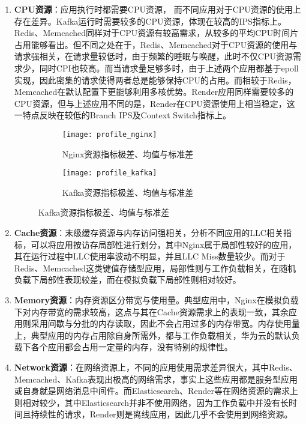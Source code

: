 \begin{enumerate}

    \item \textbf{CPU资源}：应用执行时都需要CPU资源， 而不同应用对于CPU资源的使用上存在差异。Kafka运行时需要较多的CPU资源，体现在较高的IPS指标上。Redis、Memcached同样对于CPU资源有较高需求，从较多的平均CPU时间片占用能够看出。但不同之处在于，Redis、Memcached对于CPU资源的使用与请求强相关，在请求量较低时，由于频繁的睡眠与唤醒，此时不仅CPU资源需求少，同时CPI也较高。而当请求量足够多时，由于上述两个应用都基于epoll实现，因此密集的请求使得两者总是能够保持CPU的占用。而相较于Redis，Memcached在默认配置下更能够利用多核优势。Render应用同样需要较多的CPU资源，但与上述应用不同的是，Render在CPU资源使用上相当稳定，这一特点反映在较低的Branch IPS及Context Switch指标上。

\begin{figure}[H]
    \centering
    \begin{subfigure}[b]{0.9\textwidth}
      \texttt{[image: profile\_nginx]}
      \caption{Nginx资源指标极差、均值与标准差}
      \label{fig:profile_nginx}
    \end{subfigure}
    \begin{subfigure}[b]{0.9\textwidth}
        \texttt{[image: profile\_kafka]}
        \caption{Kafka资源指标极差、均值与标准差}
        \label{fig:profile_kafka}
    \end{subfigure}
\label{fig:resource_affinity_1}
\end{figure}

    \item \textbf{Cache资源}：末级缓存资源与内存访问强相关，分析不同应用的LLC相关指标，可以将应用按访存局部性进行划分，其中Nginx属于局部性较好的应用，其在运行过程中LLC使用率波动不明显，并且LLC Miss数量较少。而对于Redis、Memcached这类键值存储型应用，局部性则与工作负载相关，在随机负载下局部性表现较差，而在模拟负载下局部性则相对较好。
    
    \item \textbf{Memory资源}：内存资源区分带宽与使用量。典型应用中，Nginx在模拟负载下对内存带宽的需求较高，这点与其在Cache资源需求上的表现一致，其余应用则采用间歇与分批的内存读取，因此不会占用过多的内存带宽。内存使用量上，典型应用的内存占用除自身所需外，都与工作负载相关，华为云的默认负载下各个应用都会占用一定量的内存，没有特别的规律性。
    
    \item \textbf{Network资源}：在网络资源上，不同的应用使用需求差异很大，其中Redis、Memcached、Kafka表现出极高的网络需求，事实上这些应用都是服务型应用或自身就是网络消息中间件。而Elasticsearch、Render等在网络资源的需求上则相对较少，其中Elasticsearch并非不使用网络，因为工作负载中并没有长时间且持续性的请求，Render则是离线应用，因此几乎不会使用到网络资源。


\end{enumerate}
